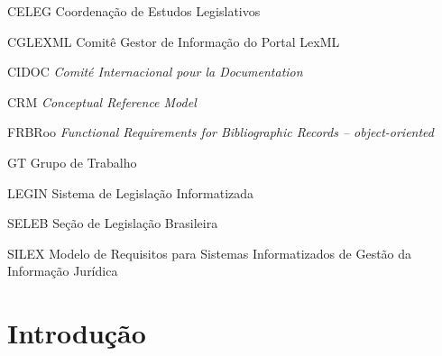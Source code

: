 \documentclass[a4paper,11pt,openright,twoside,english,brazil]{abntex2}
\begin{document}
\begin{siglas}
  \item[CELEG] Coordenação de Estudos Legislativos
  \item[CGLEXML] Comitê Gestor de Informação do Portal LexML
  \item[CIDOC] \emph{Comité Internacional pour la Documentation}
  \item[CRM] \emph{Conceptual Reference Model} 
  \item[FRBRoo] \emph{Functional Requirements for Bibliographic Records –
  object-oriented}
  \item[GT] Grupo de Trabalho
  \item[LEGIN] Sistema de Legislação Informatizada
  \item[SELEB] Seção de Legislação Brasileira
  \item[SILEX] Modelo de Requisitos para Sistemas Informatizados de Gestão da 
Informação Jurídica
\end{siglas}
% 


\tableofcontents*
\cleardoublepage


\textual

\addtocounter{page}{2}

\chapter{Introdução}
\end{document}
